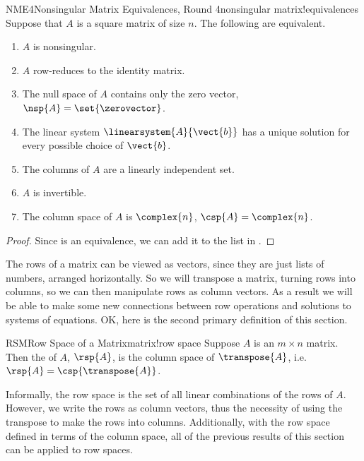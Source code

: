 %
\begin{theorem}{NME4}{Nonsingular Matrix Equivalences, Round 4}{nonsingular matrix!equivalences}
Suppose that $A$ is a square matrix of size $n$.  The following are equivalent.
%
\begin{enumerate}
\item $A$ is nonsingular.
\item $A$ row-reduces to the identity matrix.
\item The null space of $A$ contains only the zero vector, $\nsp{A}=\set{\zerovector}$.
\item The linear system $\linearsystem{A}{\vect{b}}$ has a unique solution for every possible choice of $\vect{b}$.
\item The columns of $A$ are a linearly independent set.
\item $A$ is invertible.
\item The column space of $A$ is $\complex{n}$, $\csp{A}=\complex{n}$.
\end{enumerate}
\end{theorem}
%
\begin{proof}
Since  is an equivalence, we can add it to the list in .
\end{proof}
%
%
The rows of a matrix can be viewed as vectors, since they are just lists of numbers, arranged horizontally.  So we will transpose a matrix, turning rows into columns, so we can then manipulate rows as column vectors.  As a result we will be able to make some new connections between row operations and solutions to systems of equations.  OK, here is the second primary definition of this section.\par
%
\begin{definition}{RSM}{Row Space of a Matrix}{matrix!row space}
Suppose $A$ is an $m\times n$ matrix.  Then the  of $A$, $\rsp{A}$, is the column space of $\transpose{A}$, i.e.\ $\rsp{A}=\csp{\transpose{A}}$.
\end{definition}
%
Informally, the row space is the set of all linear combinations of the rows of $A$.  However, we write the rows as column vectors, thus the necessity of using the transpose to make the rows into columns.   Additionally, with the row space defined in terms of the column space, all of the previous results of this section can be applied to row spaces.\par
